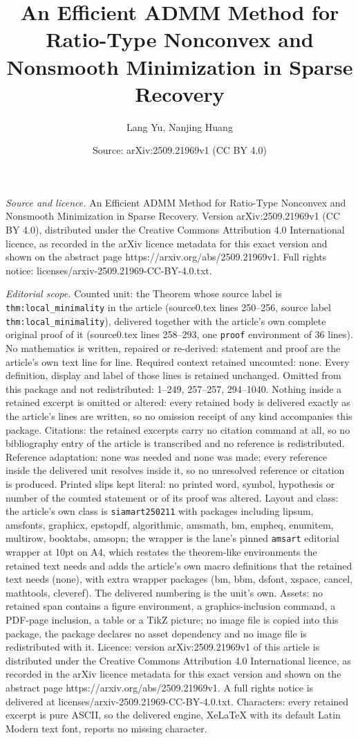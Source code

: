\documentclass[10pt,a4paper]{amsart}
\title[An Efficient ADMM Method for Ratio-Type Nonconvex and Nonsmo]{An Efficient ADMM Method for Ratio-Type Nonconvex and Nonsmooth Minimization in Sparse Recovery}
\author{Lang Yu, Nanjing Huang}
\date{Source: arXiv:2509.21969v1 (CC BY 4.0)}
\begin{document}
\maketitle

\noindent\emph{Source and licence.} An Efficient ADMM Method for Ratio-Type Nonconvex and Nonsmooth Minimization in Sparse Recovery. Version arXiv:2509.21969v1 (CC BY 4.0), distributed under the Creative Commons Attribution 4.0 International licence, as recorded in the arXiv licence metadata for this exact version and shown on the abstract page https://arxiv.org/abs/2509.21969v1. Full rights notice: licenses/arxiv-2509.21969-CC-BY-4.0.txt.\par\smallskip

\noindent\textit{Editorial scope.} Counted unit: the Theorem whose source label is \texttt{thm:local\_minimality} in the article (source0.tex lines 250--256, source label \texttt{thm:local\_minimality}), delivered together with the article's own complete original proof of it (source0.tex lines 258--293, one \texttt{proof} environment of 36 lines). No mathematics is written, repaired or re-derived: statement and proof are the article's own text line for line. Required context retained uncounted: none. Every definition, display and label of those lines is retained unchanged. Omitted from this package and not redistributed: 1--249, 257--257, 294--1040. Nothing inside a retained excerpt is omitted or altered: every retained body is delivered exactly as the article's lines are written, so no omission receipt of any kind accompanies this package. Citations: the retained excerpts carry no citation command at all, so no bibliography entry of the article is transcribed and no reference is redistributed. Reference adaptation: none was needed and none was made; every reference inside the delivered unit resolves inside it, so no unresolved reference or citation is produced. Printed slips kept literal: no printed word, symbol, hypothesis or number of the counted statement or of its proof was altered. Layout and class: the article's own class is \texttt{siamart250211} with packages including lipsum, amsfonts, graphicx, epstopdf, algorithmic, amsmath, bm, empheq, enumitem, multirow, booktabs, amsopn; the wrapper is the lane's pinned \texttt{amsart} editorial wrapper at 10pt on A4, which restates the theorem-like environments the retained text needs and adds the article's own macro definitions that the retained text needs (none), with extra wrapper packages (bm, bbm, dsfont, xspace, cancel, mathtools, cleveref). The delivered numbering is the unit's own. Assets: no retained span contains a figure environment, a graphics-inclusion command, a PDF-page inclusion, a table or a TikZ picture; no image file is copied into this package, the package declares no asset dependency and no image file is redistributed with it. Licence: version arXiv:2509.21969v1 of this article is distributed under the Creative Commons Attribution 4.0 International licence, as recorded in the arXiv licence metadata for this exact version and shown on the abstract page https://arxiv.org/abs/2509.21969v1. A full rights notice is delivered at licenses/arxiv-2509.21969-CC-BY-4.0.txt. Characters: every retained excerpt is pure ASCII, so the delivered engine, XeLaTeX with its default Latin Modern text font, reports no missing character.
\end{document}
